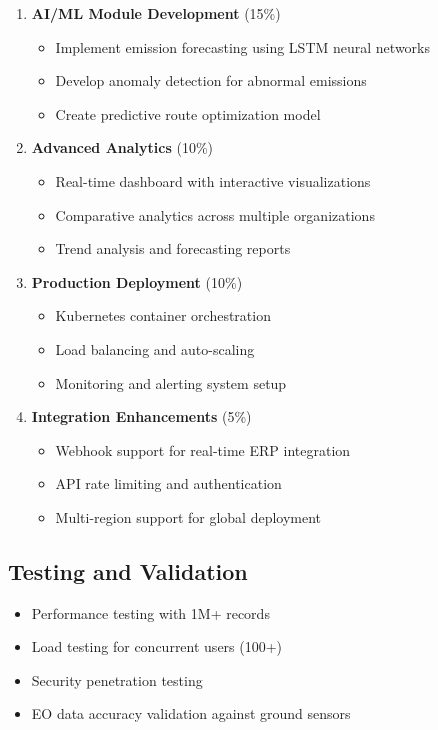 \documentclass[11pt,a4paper]{article}
\begin{document}
\begin{enumerate}
    \item \textbf{AI/ML Module Development} (15\%)
    \begin{itemize}
        \item Implement emission forecasting using LSTM neural networks
        \item Develop anomaly detection for abnormal emissions
        \item Create predictive route optimization model
    \end{itemize}
    
    \item \textbf{Advanced Analytics} (10\%)
    \begin{itemize}
        \item Real-time dashboard with interactive visualizations
        \item Comparative analytics across multiple organizations
        \item Trend analysis and forecasting reports
    \end{itemize}
    
    \item \textbf{Production Deployment} (10\%)
    \begin{itemize}
        \item Kubernetes container orchestration
        \item Load balancing and auto-scaling
        \item Monitoring and alerting system setup
    \end{itemize}
    
    \item \textbf{Integration Enhancements} (5\%)
    \begin{itemize}
        \item Webhook support for real-time ERP integration
        \item API rate limiting and authentication
        \item Multi-region support for global deployment
    \end{itemize}
\end{enumerate}

\subsection{Testing and Validation}

\begin{itemize}
    \item Performance testing with 1M+ records
    \item Load testing for concurrent users (100+)
    \item Security penetration testing
    \item EO data accuracy validation against ground sensors
\end{itemize}
\end{document}
